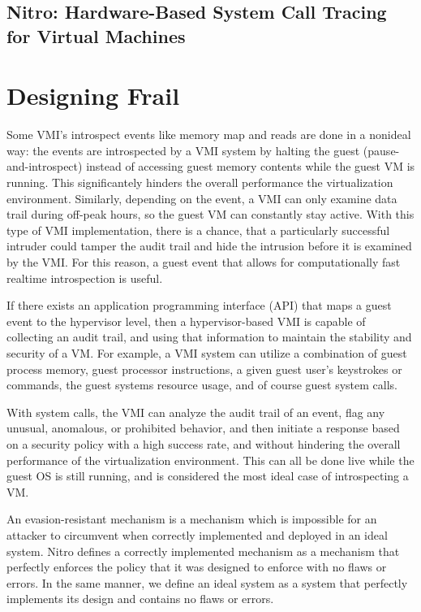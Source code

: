 \documentclass{report}
\begin{document}
\begin{spacing}{1.5}
{}

\section{Nitro: Hardware-Based System Call Tracing for Virtual Machines}

\chapter{Designing Frail}

Some VMI's introspect events like memory map and reads are done in a nonideal way: the events are introspected by a VMI system by halting the guest (pause-and-introspect) instead of accessing guest memory contents while the guest VM is running. This significantely hinders the overall performance the virtualization environment. Similarly, depending on the event, a VMI can only examine data trail during off-peak hours, so the guest VM can constantly stay active. With this type of VMI implementation, there is a chance, that a particularly successful intruder could tamper the audit trail and hide the intrusion before it is examined by the VMI. For this reason, a guest event that allows for computationally fast realtime introspection is useful.



{\large
If there exists an application programming interface (API) that maps a guest event to the hypervisor level, then a hypervisor-based VMI is capable of collecting an audit trail, and using that information to maintain the stability and security of a VM. For example, a VMI system can utilize a combination of guest process memory, guest processor instructions, a given guest user’s keystrokes or commands, the guest systems resource usage, and of course guest system calls.


With system calls, the VMI can analyze the audit trail of an event, flag any unusual, anomalous, or prohibited behavior, and then initiate a response based on a security policy with a high success rate, and without hindering the overall performance of the virtualization environment. This can all be done live while the guest OS is still running, and is considered the most ideal case of introspecting a VM.






An evasion-resistant mechanism is a mechanism which
is impossible for an attacker to circumvent when correctly implemented and
deployed in an ideal system. Nitro defines a correctly implemented mechanism as a
mechanism that perfectly enforces the policy that it was designed to enforce with
no flaws or errors. In the same manner, we define an ideal system as a system
that perfectly implements its design and contains no flaws or errors.

}
\end{spacing}
\end{document}
